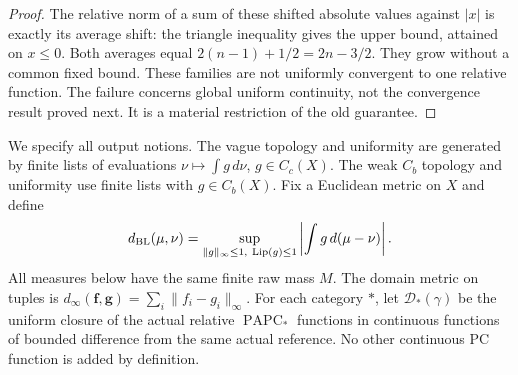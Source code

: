 \documentclass[11pt]{article}
\newcommand{\PAPC}{\operatorname{PAPC}}
\begin{document}
\begin{proof}
The relative norm of a sum of these shifted absolute values against
$|x|$ is exactly its average shift: the triangle inequality gives the
upper bound, attained on $x\leq0$. Both averages equal
$2(n-1)+1/2=2n-3/2$. They grow without a common fixed bound. These
families are not uniformly convergent to one relative function. The
failure concerns global uniform continuity, not the convergence result
proved next. It is a material restriction of the old guarantee.
\end{proof}

We specify all output notions. The vague topology and uniformity are
generated by finite lists of evaluations $\nu\mapsto\int g\,d\nu$,
$g\in C_c(X)$. The weak $C_b$ topology and uniformity use finite lists
with $g\in C_b(X)$. Fix a Euclidean metric on $X$ and define
\[
 d_{\rm BL}(\mu,\nu)=\sup_{\|g\|_\infty\leq1,\ \operatorname{Lip}(g)\leq1}
              \left|\int g\,d(\mu-\nu)\right|.
\]
All measures below have the same finite raw mass $M$. The domain metric
on tuples is $d_\infty(\mathbf f,\mathbf g)=\sum_i\|f_i-g_i\|_\infty$.
For each category $*$, let $\mathcal D_*(\gamma)$ be the uniform closure
of the actual relative $\PAPC_*$ functions in continuous functions of
bounded difference from the same actual reference. No other continuous
PC function is added by definition.
\end{document}

